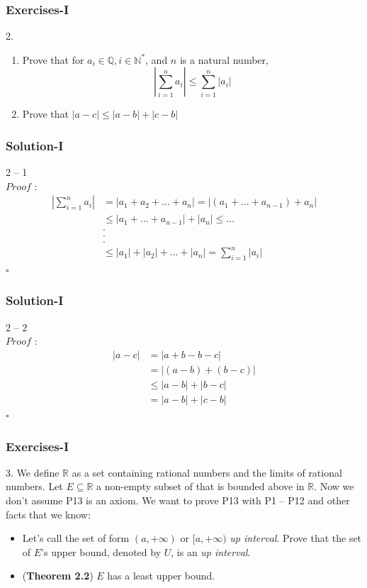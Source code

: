 \documentclass[12pt, t]{beamer}
\renewcommand{\emph}[1]{{\color{Turquoise3}\textsl{#1}}}
\newcommand{\myqed}{\hfill$\square$}
\begin{document}
\begin{frame}
    \frametitle{Exercises-I}
    2.
    \begin{enumerate}
        \item Prove that for $a_i\in \mathbb{Q}, i\in \mathbb{N^*}$, and $n$ is a natural number,
              \begin{equation*}
                  |\sum^n_{i=1}a_i|\leq\sum^n_{i=1}|a_i|
              \end{equation*}
        \item Prove that $|a-c|\leq |a-b| +|c-b|$
    \end{enumerate}
\end{frame}

\begin{frame}
    \frametitle{Solution-I}
    2 -- 1\\
    $Proof$ :
    \begin{equation*}
        \begin{split}
            |\sum^n_{i=1}a_i| &=|a_1+a_2+\dots+a_n|
            =|(a_1+\dots+a_{n-1})+a_n|\\
            &\leq |a_1+\dots+a_{n-1}|+|a_n|
            \leq \dots\\
            &.\\
            &.\\
            &.\\
            &\leq |a_1|+|a_2|+\dots+|a_n|=\sum^n_{i=1}|a_i|
        \end{split}
    \end{equation*}
    \myqed
\end{frame}

\begin{frame}
    \frametitle{Solution-I}
    2 -- 2\\
    $Proof$ :
    \begin{equation*}
        \begin{split}
            |a-c|&=|a+b-b-c|\\
            &=|(a-b)+(b-c)|\\
            &\leq|a-b|+|b-c|\\
            &=|a-b|+|c-b|
        \end{split}
    \end{equation*}
    \myqed
\end{frame}


\begin{frame}
    \frametitle{Exercises-I}
    3. We define $\mathbb{R}$ as a set containing rational numbers and the limits of rational numbers.
    Let $E\subseteq \mathbb{R}$ a non-empty subset of that is bounded above in $\mathbb{R}$. Now we don't
    assume P13 is an axiom. We want to prove P13 with P1 -- P12 and other facts that we know:
    \begin{itemize}
        \item Let's call the set of form $(a,+\infty)$ or $[a,+\infty)$ \emph{up interval}. Prove that the
              set of $E$'s upper bound, denoted by $U$, is an \emph{up interval}.
        \item (\textbf{Theorem 2.2}) $E$ has a least upper bound.
    \end{itemize}
\end{frame}
\end{document}
